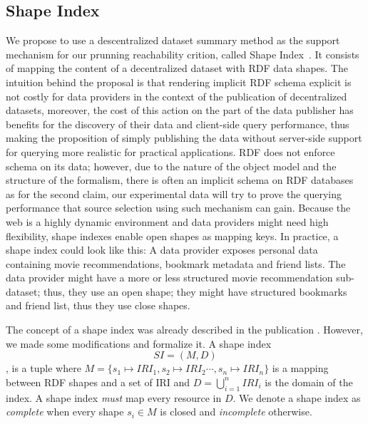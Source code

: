 \subsection{Shape Index}
We propose to use a descentralized dataset summary method as the support mechanism for our prunning reachability crition, called Shape Index~\cite{tam2024opportunitiesshapebasedoptimizationlink}.
It consists of mapping the content of a decentralized dataset with RDF data shapes.
The intuition behind the proposal is that rendering implicit RDF schema explicit is not costly for data providers in the context of the publication of decentralized datasets,
moreover, the cost of this action on the part of the data publisher has benefits for the discovery of their data and client-side query performance, thus making the proposition of simply publishing the data without server-side support for querying more realistic for practical applications.
RDF does not enforce schema on its data; however, due to the nature of the object model and the structure of the formalism, there is often
an implicit schema on RDF databases~\cite{Neumann2011CharacteristicSA} as for the second claim, our experimental data will try to prove the querying performance that source selection using 
such mechanism can gain.
Because the web is a highly dynamic environment and data providers might need high flexibility, shape indexes enable open shapes as mapping keys.
In practice, a shape index could look like this: A data provider exposes personal data containing movie recommendations, bookmark metadata and friend lists.
The data provider might have a more or less structured movie recommendation sub-dataset; thus, they use an open shape; they might have structured bookmarks and friend list, thus they 
use close shapes.

The concept of a shape index was already described in the publication . 
However, we made some modifications and formalize it.
A shape index 
\begin{equation}\label{eq:shapeIndex}
   SI = (M, D)
\end{equation}
, is a tuple where $M = \{s_1 \mapsto IRI_1, s_2 \mapsto IRI_2 \cdots, s_n \mapsto IRI_n\}$ is a mapping between RDF shapes and a set of IRI 
and $D = \bigcup\limits_{i=1}^{n} IRI_i$ is the domain of the index.
A shape index \emph{must} map every resource in $D$.
We denote a shape index as \emph{complete} when every shape $s_i \in M$ is closed and \emph{incomplete} otherwise.


